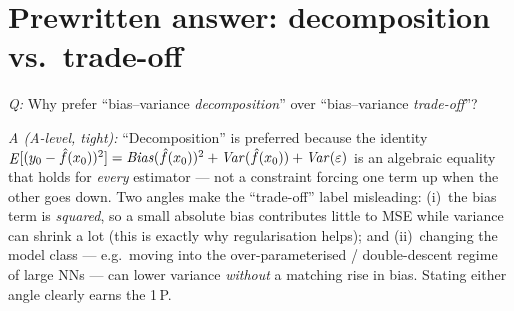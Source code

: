 \section{Prewritten answer: decomposition vs.\ trade-off}

\emph{Q:} Why prefer ``bias--variance \emph{decomposition}'' over ``bias--variance \emph{trade-off}''?

\emph{A (A-level, tight):} ``Decomposition'' is preferred because the identity
$\mathop{\mathit{E}}[(y_0-\hat f(x_0))^2] = \mathop{\mathit{Bias}}(\hat f(x_0))^2 + \mathop{\mathit{Var}}(\hat f(x_0)) + \mathop{\mathit{Var}}(\varepsilon)$
is an algebraic equality that holds for \emph{every} estimator --- not a constraint forcing one
term up when the other goes down. Two angles make the ``trade-off'' label misleading:
(i)~the bias term is \emph{squared}, so a small absolute bias contributes little to MSE while
variance can shrink a lot (this is exactly why regularisation helps); and
(ii)~changing the model class --- e.g.\ moving into the over-parameterised /
double-descent regime of large NNs --- can lower variance \emph{without} a matching rise
in bias. Stating either angle clearly earns the 1\,P.
